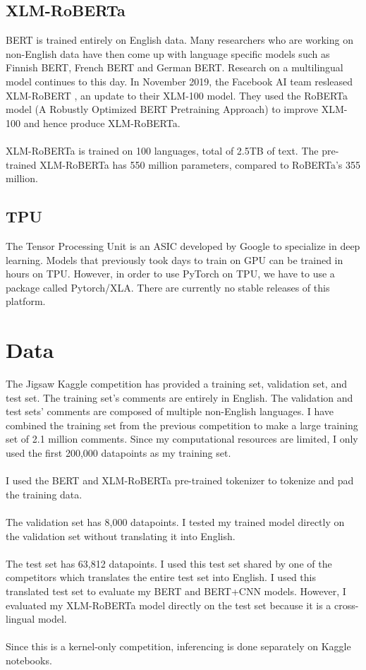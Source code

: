 \documentclass[11pt,a4paper]{article}
\begin{document}
\subsection{XLM-RoBERTa}

BERT is trained entirely on English data. Many researchers who are working on non-English data have then come up with language specific models such as Finnish BERT, French BERT and German BERT. Research on a multilingual model continues to this day. In November 2019, the Facebook AI team resleased XLM-RoBERT \cite{xlm-roberta}, an update to their XLM-100 model. They used the RoBERTa \cite{roberta} model (A Robustly Optimized BERT Pretraining Approach) to improve XLM-100 and hence produce XLM-RoBERTa.\\
\\
XLM-RoBERTa is trained on 100 languages, total of 2.5TB of text. The pre-trained XLM-RoBERTa has 550 million parameters, compared to RoBERTa's 355 million.

\subsection{TPU}

The Tensor Processing Unit is an ASIC developed by Google to specialize in deep learning. Models that previously took days to train on GPU can be trained in hours on TPU. However, in order to use PyTorch on TPU, we have to use a package called Pytorch/XLA. There are currently no stable releases of this platform.

\section{Data}

The Jigsaw Kaggle competition \cite{kaggle} has provided a training set, validation set, and test set. The training set’s comments are entirely in English. The validation and test sets' comments are composed of multiple non-English languages. I have combined the training set from the previous competition to make a large training set of 2.1 million comments. Since my computational resources are limited, I only used the first 200,000 datapoints as my training set. \\
\\
I used the BERT and XLM-RoBERTa pre-trained tokenizer to tokenize and pad the training data.\\
\\
The validation set has 8,000 datapoints. I tested my trained model directly on the validation set without translating it into English.\\
\\
The test set has 63,812 datapoints. I used this test set shared by one of the competitors \cite{test-en-df} which translates the entire test set into English. I used this translated test set to evaluate my BERT and BERT+CNN models. However,  I evaluated my XLM-RoBERTa model directly on the test set because it is a cross-lingual model.\\ 
\\
Since this is a kernel-only competition, inferencing is done separately on Kaggle notebooks.
\end{document}
